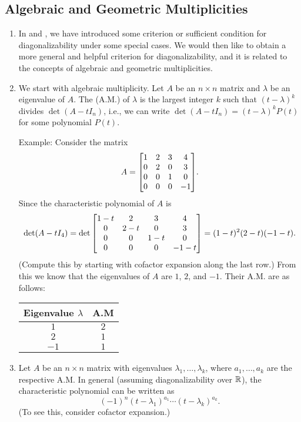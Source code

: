 \subsection{Algebraic and Geometric Multiplicities}
\begin{enumerate}
\item In  and
, we have introduced some criterion or
sufficient condition for diagonalizability under some special cases. We would
then like to obtain a more general and helpful criterion for diagonalizability,
and it is related to the concepts of algebraic and geometric multiplicities.

\item We start with algebraic multiplicity. Let \(A\) be an \(n\times n\)
matrix and \(\lambda\) be an eigenvalue of \(A\). The  (A.M.) of \(\lambda\) is the largest integer \(k\) such that
\((t-\lambda)^{k}\) divides \(\det(A-tI_n)\), i.e., we can write
\(\det(A-tI_n)=(t-\lambda)^{k}P(t)\) for some polynomial \(P(t)\).

Example: Consider the matrix
\[
A=\mqty[1&2&3&4\\ 0&2&0&3\\ 0&0&1&0\\ 0&0&0&-1].
\]
Since the characteristic polynomial of \(A\) is
\[
\det(A-tI_4)=\det\mqty[1-t&2&3&4\\ 0&2-t&0&3\\ 0&0&1-t&0\\ 0&0&0&-1-t]
=(1-t)^2(2-t)(-1-t).
\]
(Compute this by starting with cofactor expansion along the last row.)
From this we know that the eigenvalues of \(A\) are \(1\), \(2\), and \(-1\).
Their A.M. are as follows:
\begin{center}
\begin{tabular}{cc}
\toprule
Eigenvalue \(\lambda\)&A.M\\
\midrule
\(1\)&\(2\)\\
\(2\)&\(1\)\\
\(-1\)&\(1\)\\
\bottomrule
\end{tabular}
\end{center}

\item \label{it:char-poly-am}
Let \(A\) be an \(n\times n\) matrix with eigenvalues
\(\lambda_1,\dotsc,\lambda_k\), where \(a_1,\dotsc,a_k\) are the respective
A.M. In general (assuming diagonalizability over \(\mathbb{R}\)), the characteristic
polynomial can be written as
\[
(-1)^{n}(t-\lambda_1)^{a_1}\dotsb(t-\lambda_k)^{a_k}.
\]
(To see this, consider cofactor expansion.)


\end{enumerate}
